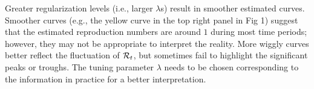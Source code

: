 Greater regularization levels (i.e., larger $\lambda$s) result in smoother estimated curves. Smoother curves (e.g., the yellow curve in the top right panel in Fig 1) suggest that the estimated reproduction numbers are around $1$ during most time periods; however, they may not be appropriate to interpret the reality. More wiggly curves better reflect the fluctuation of $\mathcal{R}_t$, but sometimes fail to highlight the significant peaks or troughs. The tuning parameter $\lambda$ needs to be chosen corresponding to the information in practice for a better interpretation.
